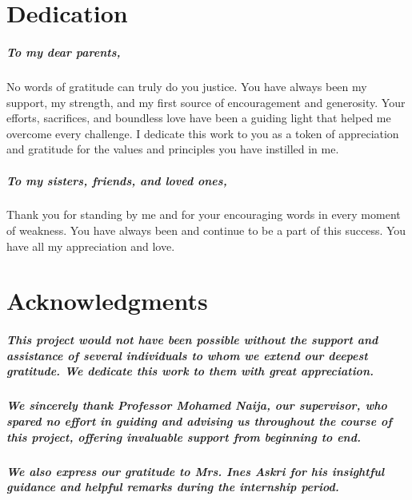 \documentclass[a4paper,12pt]{report}
\begin{document}

\dominitoc
\chapter*{Dedication}
\paragraph{To my dear parents,}  
No words of gratitude can truly do you justice.  
You have always been my support, my strength, and my first source of encouragement and generosity.  
Your efforts, sacrifices, and boundless love have been a guiding light that helped me overcome every challenge.  
I dedicate this work to you as a token of appreciation and gratitude for the values and principles you have instilled in me.

\paragraph{To my sisters, friends, and loved ones,}  
Thank you for standing by me and for your encouraging words in every moment of weakness.  
You have always been and continue to be a part of this success.  
You have all my appreciation and love.

\newpage

\chapter*{Acknowledgments}
\paragraph{This project would not have been possible without the support and assistance of several individuals to whom we extend our deepest gratitude. We dedicate this work to them with great appreciation.}

\paragraph{We sincerely thank Professor Mohamed Naija, our supervisor, who spared no effort in guiding and advising us throughout the course of this project, offering invaluable support from beginning to end.}

\paragraph{We also express our gratitude to Mrs. Ines Askri for his insightful guidance and helpful remarks during the internship period.}
\end{document}
